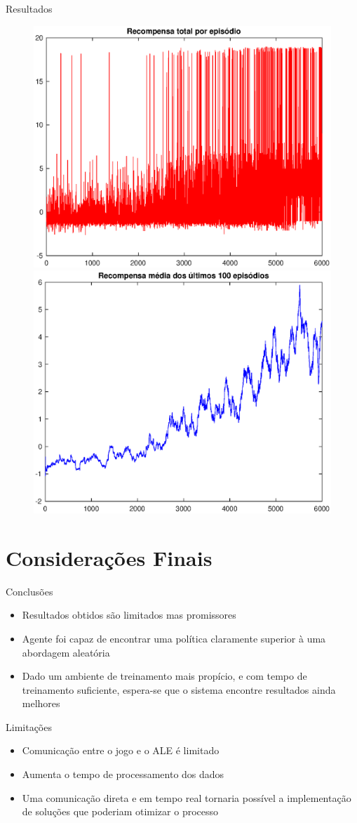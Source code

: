 \documentclass[aspectratio=169]{beamer}
\begin{document}
\begin{frame}{Resultados}
	\begin{figure}[h]
  \centering
  \includegraphics[width=.5 \textwidth]{imgs/resultados/historico_recompensa_v2.eps}
  \includegraphics[width=.5 \textwidth]{imgs/resultados/resompensa_media_100_epis_v2.eps}
  \label{fig:resultados_v2}
\end{figure}
\end{frame}

\section{Considerações Finais}

\begin{frame}{Conclusões}
	\begin{block}{}
		\begin{itemize}
			\item Resultados obtidos são limitados mas promissores
			\item Agente foi capaz de encontrar uma política claramente superior à uma abordagem aleatória
			\item Dado um ambiente de treinamento mais propício, e com tempo de treinamento suficiente, espera-se que o sistema encontre resultados ainda melhores
		\end{itemize}
	\end{block}
	\pause
	\begin{block}{Limitações}
		\begin{itemize}
			\item Comunicação entre o jogo e o ALE é limitado
			\item Aumenta o tempo de processamento dos dados
			\item Uma comunicação direta e em tempo real tornaria possível a implementação de soluções que poderiam otimizar o processo
		\end{itemize}
	\end{block}
\end{frame}
\end{document}
